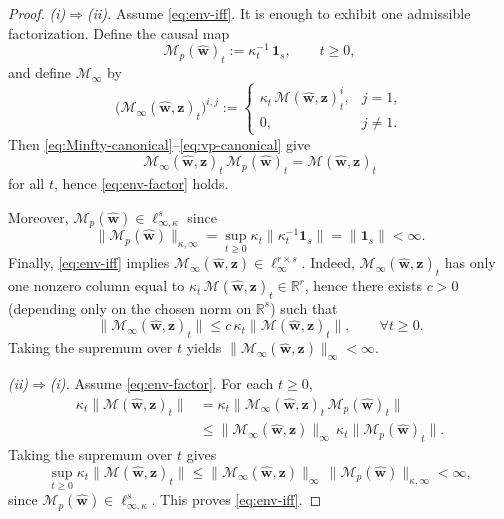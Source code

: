 \documentclass[journal,twoside,web]{ieeecolor}
\newcommand{\disturbance}{\mathbf{\widehat w}}
\newcommand{\operator}{\mathcal{M}}
\begin{document}
\begin{proof}
\emph{(i)$\Rightarrow$(ii).}
Assume \eqref{eq:env-iff}. It is enough to exhibit one admissible factorization.
Define the causal map
\begin{equation}\label{eq:vp-canonical}
\operator_p(\disturbance)_t := \kappa_t^{-1}\,\mathbf 1_s,\qquad t\ge 0,
\end{equation}
and define \(\operator_\infty\) by
\begin{equation}\label{eq:Minfty-canonical}
\big(\operator_\infty(\disturbance,\mathbf z)_t\big)^{i,j}
:=
\begin{cases}
\kappa_t\,\operator(\disturbance,\mathbf z)_t^{i}, & j=1,\\
0, & j\neq 1.
\end{cases}
\end{equation}
Then \eqref{eq:Minfty-canonical}--\eqref{eq:vp-canonical} give
\[
\operator_\infty(\disturbance,\mathbf z)_t\,
\operator_p(\disturbance)_t
=
\operator(\disturbance,\mathbf z)_t
\]
for all \(t\), hence \eqref{eq:env-factor} holds.

Moreover, \(\operator_p(\disturbance)\in \ell_{\infty,\kappa}^s\) since
\[
\|\operator_p(\disturbance)\|_{\kappa,\infty}
=
\sup_{t\ge 0}\kappa_t\|\kappa_t^{-1}\mathbf 1_s\|
=
\|\mathbf 1_s\|<\infty.
\]
Finally, \eqref{eq:env-iff} implies
\(\operator_\infty(\disturbance,\mathbf z)\in \ell_\infty^{r\times s}\).
Indeed, \(\operator_\infty(\disturbance,\mathbf z)_t\) has only one nonzero column equal to
\(\kappa_t\,\operator(\disturbance,\mathbf z)_t\in\mathbb R^r\), hence there exists \(c>0\)
(depending only on the chosen norm on \(\mathbb R^s\)) such that
\[
\|\operator_\infty(\disturbance,\mathbf z)_t\|
\le
c\,\kappa_t\|\operator(\disturbance,\mathbf z)_t\|,
\qquad \forall t\ge 0.
\]
Taking the supremum over \(t\) yields
\(\|\operator_\infty(\disturbance,\mathbf z)\|_\infty<\infty\).

\smallskip
\emph{(ii)$\Rightarrow$(i).}
Assume \eqref{eq:env-factor}. For each \(t\ge 0\),
\begin{align*}
\kappa_t\|\operator(\disturbance,\mathbf z)_t\|
 & =
\kappa_t\|\operator_\infty(\disturbance,\mathbf z)_t
\,\operator_p(\disturbance)_t\| \\
& \le
\|\operator_\infty(\disturbance,\mathbf z)\|_\infty\,
\kappa_t\|\operator_p(\disturbance)_t\|.
\end{align*}
Taking the supremum over \(t\) gives
\[
\sup_{t\ge 0}\kappa_t\|\operator(\disturbance,\mathbf z)_t\|
\le
\|\operator_\infty(\disturbance,\mathbf z)\|_\infty\,
\|\operator_p(\disturbance)\|_{\kappa,\infty}
<\infty,
\]
since \(\operator_p(\disturbance)\in \ell_{\infty,\kappa}^s\). This proves \eqref{eq:env-iff}.
\end{proof}
\end{document}
